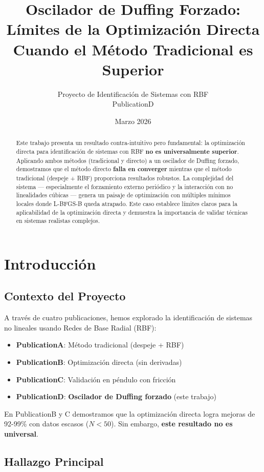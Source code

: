 \documentclass[11pt,a4paper]{article}
\title{\textbf{Oscilador de Duffing Forzado:\\Límites de la Optimización Directa}\\[0.5em]
\large Cuando el Método Tradicional es Superior}
\author{Proyecto de Identificación de Sistemas con RBF\\PublicationD}
\date{Marzo 2026}
\begin{document}
\maketitle

\begin{abstract}
Este trabajo presenta un resultado contra-intuitivo pero fundamental: la optimización directa para identificación de sistemas con RBF \textbf{no es universalmente superior}. Aplicando ambos métodos (tradicional y directo) a un oscilador de Duffing forzado, demostramos que el método directo \textbf{falla en converger} mientras que el método tradicional (despeje + RBF) proporciona resultados robustos. La complejidad del sistema --- especialmente el forzamiento externo periódico y la interacción con no linealidades cúbicas --- genera un paisaje de optimización con múltiples mínimos locales donde L-BFGS-B queda atrapado. Este caso establece límites claros para la aplicabilidad de la optimización directa y demuestra la importancia de validar técnicas en sistemas realistas complejos.
\end{abstract}

\section{Introducción}

\subsection{Contexto del Proyecto}

A través de cuatro publicaciones, hemos explorado la identificación de sistemas no lineales usando Redes de Base Radial (RBF):

\begin{itemize}
\item \textbf{PublicationA}: Método tradicional (despeje + RBF)
\item \textbf{PublicationB}: Optimización directa (sin derivadas)
\item \textbf{PublicationC}: Validación en péndulo con fricción
\item \textbf{PublicationD}: \textbf{Oscilador de Duffing forzado} (este trabajo)
\end{itemize}

En PublicationB y C demostramos que la optimización directa logra mejoras de 92-99\% con datos escasos ($N < 50$). Sin embargo, \textbf{este resultado no es universal}.

\subsection{Hallazgo Principal}
\end{document}
